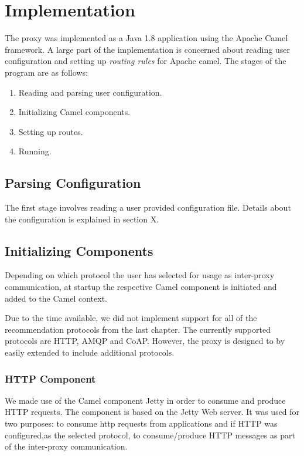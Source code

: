 \section{Implementation}

The proxy was implemented as a Java 1.8 application using the Apache Camel
framework. A large part of the implementation is concerned about reading user
configuration and setting up \textit{routing rules} for Apache camel. The stages
of the program are as follows:

\begin{enumerate}
    \item Reading and parsing user configuration.
    \item Initializing Camel components.
    \item Setting up routes.
    \item Running.
\end{enumerate}

\subsection{Parsing Configuration}

The first stage involves reading a user provided configuration file. Details about the configuration is explained in section X.

\subsection{Initializing Components}

Depending on which protocol the user has selected for usage as inter-proxy
communication, at startup the respective Camel component is initiated  and added
to the Camel context.

Due to the time available, we did not implement support for all of the
recommendation protocols from the last chapter. The currently supported protocols
are HTTP, AMQP and CoAP. However, the proxy is designed to by easily extended to
include additional protocols.

\subsubsection{HTTP Component}

We made use of the Camel component Jetty in order to consume and produce HTTP
requests. The component is based on the Jetty Web server\cite{jetty-homepage}.
It was used for two purposes: to consume \gls{http} requests from applications
and if HTTP was configured,as the selected protocol, to consume/produce HTTP
messages as part of the inter-proxy communication.

